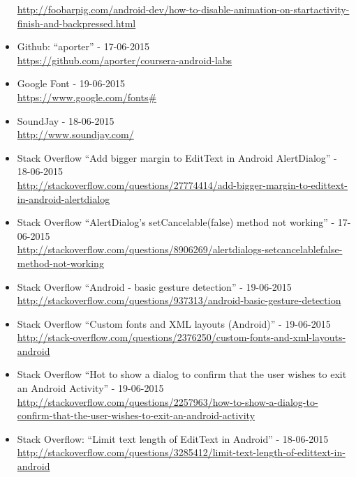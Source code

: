 \begin{itemize}
\url{http://foobarpig.com/android-dev/how-to-disable-animation-on-startactivity-finish-and-backpressed.html}
	\item Github: “aporter” - 17-06-2015 \\
\url{https://github.com/aporter/coursera-android-labs}
	\item Google Font - 19-06-2015 \\
\url{https://www.google.com/fonts#}
	\item SoundJay - 18-06-2015 \\
\url{http://www.soundjay.com/}
	\item Stack Overflow “Add bigger margin to EditText in Android AlertDialog” - 18-06-2015 \\	\url{http://stackoverflow.com/questions/27774414/add-bigger-margin-to-edittext-in-android-alertdialog}
	\item Stack Overflow “AlertDialog’s setCancelable(false) method not working” - 17-06-2015 \\	\url{http://stackoverflow.com/questions/8906269/alertdialogs-setcancelablefalse-method-not-working}
	\item Stack Overflow “Android - basic gesture detection” - 19-06-2015 \\
\url{http://stackoverflow.com/questions/937313/android-basic-gesture-detection}	
	\item Stack Overflow “Custom fonts and XML layouts (Android)” - 19-06-2015 \\ 
\url{http://stack-overflow.com/questions/2376250/custom-fonts-and-xml-layouts-android}
	\item Stack Overflow “Hot to show a dialog to confirm that the user wishes to exit an Android Activity” - 19-06-2015 \\ 
\url{http://stackoverflow.com/questions/2257963/how-to-show-a-dialog-to-confirm-that-the-user-wishes-to-exit-an-android-activity}
	\item Stack Overflow: “Limit text length of EditText in Android” - 18-06-2015 \\
\url{http://stackoverflow.com/questions/3285412/limit-text-length-of-edittext-in-android}
\end{itemize}